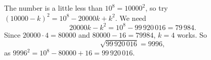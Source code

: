 The number is a little less than $10^8=10000^2$, so try $(10000-k)^2=10^8-20000k+k^2$. We need
\[20000k-k^2=10^8-99\,920\,016=79\,984 .\]
Since $20000\cdot4=80000$ and $80000-16=79984$, $k=4$ works. So
\[\sqrt{99\,920\,016}=\boxed{9996},\]
as $9996^2=10^8-80000+16=99\,920\,016$.
